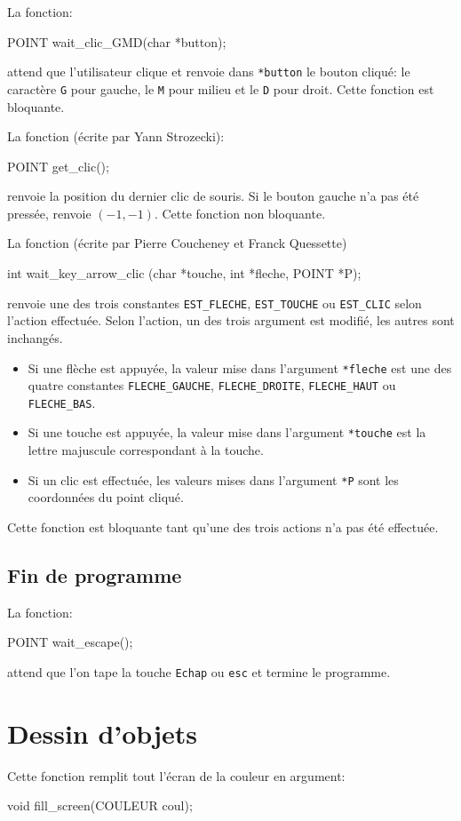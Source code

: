 \documentclass{report}
\newcommand\code[1]{
\begin{mdframed}[linecolor=purple,backgroundcolor=blue!10]
{\tt
#1
}
\end{mdframed}
}
\begin{document}
La fonction:
\code{
POINT wait\_clic\_GMD(char *button);
}
attend que l'utilisateur clique  et renvoie dans \texttt{*button} le bouton cliqué:
le caractère \texttt{G} pour gauche, le \texttt{M} pour milieu et le \texttt{D} pour droit.
Cette fonction est bloquante.

La fonction (écrite par Yann Strozecki):
\code{
POINT get\_clic();
}
renvoie la position du dernier clic de souris.
Si le bouton gauche n'a pas été pressée, renvoie $(-1,-1)$.
Cette fonction non bloquante.

La fonction (écrite par Pierre Coucheney et Franck Quessette)
\code{
int wait\_key\_arrow\_clic (char *touche, int *fleche, POINT *P);
}
renvoie une des trois constantes \texttt{EST\_FLECHE}, \texttt{EST\_TOUCHE} ou \texttt{EST\_CLIC} selon l'action effectuée.
Selon l'action, un des trois argument est modifié, les autres sont inchangés.
\begin{itemize}
\item Si une flèche est appuyée, la valeur mise dans l'argument \texttt{*fleche} est une des quatre constantes \texttt{FLECHE\_GAUCHE},
\texttt{FLECHE\_DROITE}, \texttt{FLECHE\_HAUT} ou \texttt{FLECHE\_BAS}.
\item Si une touche est appuyée, la valeur mise dans l'argument \texttt{*touche} est la lettre majuscule correspondant à la touche.
\item Si un clic est effectuée, les valeurs mises dans l'argument \texttt{*P} sont les coordonnées du point cliqué.
\end{itemize}
Cette fonction est bloquante tant qu'une des trois actions n'a pas été effectuée.

\subsection{Fin de programme}

La fonction:
\code{
POINT wait\_escape();
}
attend que l'on tape la touche \texttt{Echap} ou \texttt{esc} et termine le programme.

\section{Dessin d'objets}
Cette fonction remplit tout l'écran de la couleur en argument:
\code{
void fill\_screen(COULEUR coul);
}
\end{document}
